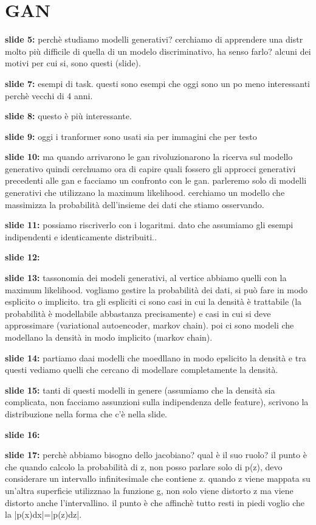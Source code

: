 \chapter{GAN}

\textbf{slide 5:} perchè studiamo modelli generativi? cerchiamo di apprendere una distr molto più difficile 
di quella di un modelo discriminativo, ha senso farlo? alcuni dei motivi per cui si, sono questi (slide).

\textbf{slide 7:} esempi di task. questi sono esempi che oggi sono un po meno interessanti perchè vecchi di 
4 anni. 

\textbf{slide 8:} questo è più interessante.

\textbf{slide 9:} oggi i tranformer sono usati sia per immagini che per testo

\textbf{slide 10:} ma quando arrivarono le gan rivoluzionarono la ricerva sul modello generativo quindi 
cerchuamo ora di capire quali fossero gli approcci generativi precedenti alle gan e facciamo un confronto
con le gan. parleremo solo di modelli generativi che utilizzano la maximum likelihood. cerchiamo un modello
che massimizza la probabilità dell'insieme dei dati che stiamo osservando.

\textbf{slide 11:} possiamo riscriverlo con i logaritmi. dato che assumiamo gli esempi indipendenti e 
identicamente distribuiti..

\textbf{slide 12:} 

\textbf{slide 13:} tassonomia dei modeli generativi, al vertice abbiamo quelli con la maximum likelihood.
vogliamo gestire la probabilità dei dati, si può fare in modo esplicito o implicito. tra gli espliciti ci sono
casi in cui la densità è trattabile (la probabilità è modellabile abbastanza precisamente) e casi in cui si
deve approssimare (variational autoencoder, markov chain). poi ci sono modeli che modellano la densità in modo
implicito (markov chain).

\textbf{slide 14:} partiamo daai modelli che moedllano in modo epslicito la densità e tra questi vediamo 
quelli che cercano di modellare completamente la densità.

\textbf{slide 15:} tanti di questi modelli in genere (assumiamo che la densità sia complicata, non facciamo
assunzioni sulla indipendenza delle feature), scrivono la distribuzione nella forma che c'è nella slide.

\textbf{slide 16:}

\textbf{slide 17:} perchè abbiamo bisogno dello jacobiano? qual è il suo ruolo? il punto è che quando calcolo
la probabilità di z, non posso parlare solo di p(z), devo considerare un intervallo infinitesimale che contiene
z. quando z viene mappata su un'altra superficie utilizznao la funzione g, non solo viene distorto z ma viene
distorto anche l'intervallino. il punto è che affinchè tutto resti in piedi voglio che la |p(x)dx|=|p(z)dz|.

